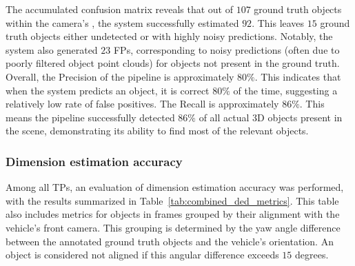 The accumulated confusion matrix reveals that out of $107$ ground truth objects within the camera's , the system successfully estimated $92$. This leaves $15$ ground truth objects either undetected or with highly noisy predictions. Notably, the system also generated $23$ FPs, corresponding to noisy predictions (often due to poorly filtered object point clouds) for objects not present in the ground truth.
Overall, the Precision of the pipeline is approximately $80\%$. This indicates that when the system predicts an object, it is correct $80\%$ of the time, suggesting a relatively low rate of false positives. The Recall is approximately $86\%$. This means the pipeline successfully detected $86\%$ of all actual 3D objects present in the scene, demonstrating its ability to find most of the relevant objects.

\subsubsection{Dimension estimation accuracy} \label{sec:dimension_estimation_accuracy}
Among all TPs, an evaluation of dimension estimation accuracy was performed, with the results summarized in Table~\ref{tab:combined_ded_metrics}. This table also includes metrics for objects in frames grouped by their alignment with the vehicle's front camera. This grouping is determined by the yaw angle difference between the annotated ground truth objects and the vehicle's orientation. An object is considered not aligned if this angular difference exceeds $15$ degrees.


